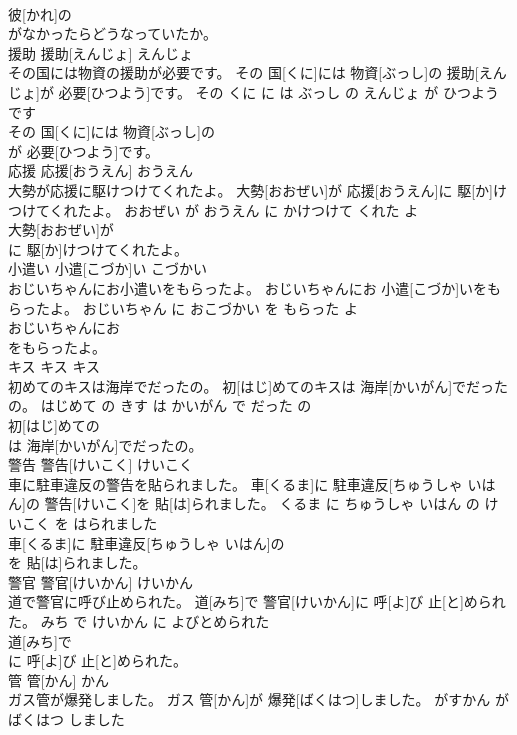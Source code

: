 \documentclass[8pt]{extreport}
\begin{document}
\begin{CJK}{UTF8}{min}
\\	彼[かれ]の
\\	がなかったらどうなっていたか。			
\\	援助	援助[えんじょ]	えんじょ	
\\	その国には物資の援助が必要です。	その 国[くに]には 物資[ぶっし]の 援助[えんじょ]が 必要[ひつよう]です。	その くに に は ぶっし の えんじょ が ひつよう です	
\\	その 国[くに]には 物資[ぶっし]の
\\	が 必要[ひつよう]です。			
\\	応援	応援[おうえん]	おうえん	
\\	大勢が応援に駆けつけてくれたよ。	大勢[おおぜい]が 応援[おうえん]に 駆[か]けつけてくれたよ。	おおぜい が おうえん に かけつけて くれた よ	
\\	大勢[おおぜい]が
\\	に 駆[か]けつけてくれたよ。			
\\	小遣い	小遣[こづか]い	こづかい	
\\	おじいちゃんにお小遣いをもらったよ。	おじいちゃんにお 小遣[こづか]いをもらったよ。	おじいちゃん に おこづかい を もらった よ	
\\	おじいちゃんにお
\\	をもらったよ。			
\\	キス	キス	キス	
\\	初めてのキスは海岸でだったの。	初[はじ]めてのキスは 海岸[かいがん]でだったの。	はじめて の きす は かいがん で だった の	
\\	初[はじ]めての
\\	は 海岸[かいがん]でだったの。			
\\	警告	警告[けいこく]	けいこく	
\\	車に駐車違反の警告を貼られました。	車[くるま]に 駐車違反[ちゅうしゃ いはん]の 警告[けいこく]を 貼[は]られました。	くるま に ちゅうしゃ いはん の けいこく を はられました	
\\	車[くるま]に 駐車違反[ちゅうしゃ いはん]の
\\	を 貼[は]られました。			
\\	警官	警官[けいかん]	けいかん	
\\	道で警官に呼び止められた。	道[みち]で 警官[けいかん]に 呼[よ]び 止[と]められた。	みち で けいかん に よびとめられた	
\\	道[みち]で
\\	に 呼[よ]び 止[と]められた。			
\\	管	管[かん]	かん	
\\	ガス管が爆発しました。	ガス 管[かん]が 爆発[ばくはつ]しました。	がすかん が ばくはつ しました	

\end{CJK}
\end{document}
